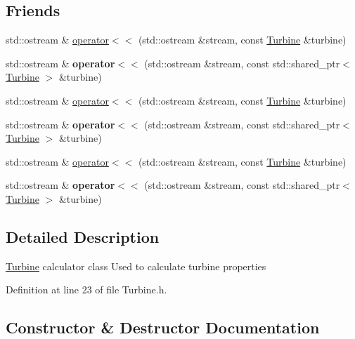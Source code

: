 \subsection*{Friends}
\begin{DoxyCompactItemize}
\item 
std\+::ostream \& \hyperlink{class_turbine_a9c58dbc00958ac1b59a59fa3785e86bd}{operator$<$$<$} (std\+::ostream \&stream, const \hyperlink{class_turbine}{Turbine} \&turbine)
\item 
\mbox{\label{class_turbine_ad07b95b5f30efb6672a07be5f98f51a8}} 
std\+::ostream \& {\bfseries operator$<$$<$} (std\+::ostream \&stream, const std\+::shared\+\_\+ptr$<$ \hyperlink{class_turbine}{Turbine} $>$ \&turbine)
\item 
std\+::ostream \& \hyperlink{class_turbine_a9c58dbc00958ac1b59a59fa3785e86bd}{operator$<$$<$} (std\+::ostream \&stream, const \hyperlink{class_turbine}{Turbine} \&turbine)
\item 
\mbox{\label{class_turbine_ad07b95b5f30efb6672a07be5f98f51a8}} 
std\+::ostream \& {\bfseries operator$<$$<$} (std\+::ostream \&stream, const std\+::shared\+\_\+ptr$<$ \hyperlink{class_turbine}{Turbine} $>$ \&turbine)
\item 
std\+::ostream \& \hyperlink{class_turbine_a9c58dbc00958ac1b59a59fa3785e86bd}{operator$<$$<$} (std\+::ostream \&stream, const \hyperlink{class_turbine}{Turbine} \&turbine)
\item 
\mbox{\label{class_turbine_ad07b95b5f30efb6672a07be5f98f51a8}} 
std\+::ostream \& {\bfseries operator$<$$<$} (std\+::ostream \&stream, const std\+::shared\+\_\+ptr$<$ \hyperlink{class_turbine}{Turbine} $>$ \&turbine)
\end{DoxyCompactItemize}


\subsection{Detailed Description}
\hyperlink{class_turbine}{Turbine} calculator class Used to calculate turbine properties 

Definition at line 23 of file Turbine.\+h.



\subsection{Constructor \& Destructor Documentation}
\mbox{\label{class_turbine_a3c3c871b9fe57d48dd06b109794381dc}} 
